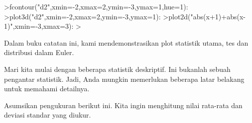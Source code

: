 \documentclass[a4paper,10pt]{article}
\begin{document}
\begin{eulernotebook}
\begin{eulercomment}
\begin{eulercomment}
\begin{eulercomment}
\begin{eulercomment}
\begin{eulercomment}
\begin{eulercomment}
\begin{eulercomment}
\begin{eulercomment}
\begin{eulercomment}
\begin{eulercomment}
\begin{eulercomment}
\begin{eulercomment}
\begin{eulercomment}
\begin{eulercomment}
\begin{eulercomment}
\begin{eulercomment}
\begin{eulercomment}
\begin{eulercomment}
\begin{eulercomment}
\begin{eulercomment}
\begin{eulercomment}
\begin{eulercomment}
\begin{eulercomment}
\begin{eulercomment}
\begin{eulercomment}
\begin{eulercomment}
\begin{eulercomment}
\begin{eulercomment}
\begin{eulercomment}
\begin{eulercomment}
\begin{eulercomment}
\begin{eulercomment}
\begin{eulercomment}
\begin{eulercomment}
\begin{eulercomment}
\begin{eulercomment}
\begin{eulercomment}
\begin{eulercomment}
\begin{eulercomment}
\begin{eulercomment}
\begin{eulercomment}
\begin{eulercomment}
\begin{eulerprompt}
>fcontour("d2",xmin=-2,xmax=2,ymin=-3,ymax=1,hue=1):
>plot3d("d2",xmin=-2,xmax=2,ymin=-3,ymax=1):
>plot2d("abs(x+1)+abs(x-1)",xmin=-3,xmax=3):
>  
\end{eulerprompt}
\begin{euleroutput}
  
\end{euleroutput}
\begin{eulercomment}
\begin{eulercomment}
\begin{eulercomment}
Dalam buku catatan ini, kami mendemonstrasikan plot statistik utama,
tes dan distribusi dalam Euler.

Mari kita mulai dengan beberapa statistik deskriptif. Ini bukanlah
sebuah pengantar statistik. Jadi, Anda mungkin memerlukan beberapa
latar belakang untuk memahami detailnya.

Asumsikan pengukuran berikut ini. Kita ingin menghitung nilai
rata-rata dan deviasi standar yang diukur.


\end{eulercomment}
\end{eulercomment}
\end{eulercomment}
\end{eulercomment}
\end{eulercomment}
\end{eulercomment}
\end{eulercomment}
\end{eulercomment}
\end{eulercomment}
\end{eulercomment}
\end{eulercomment}
\end{eulercomment}
\end{eulercomment}
\end{eulercomment}
\end{eulercomment}
\end{eulercomment}
\end{eulercomment}
\end{eulercomment}
\end{eulercomment}
\end{eulercomment}
\end{eulercomment}
\end{eulercomment}
\end{eulercomment}
\end{eulercomment}
\end{eulercomment}
\end{eulercomment}
\end{eulercomment}
\end{eulercomment}
\end{eulercomment}
\end{eulercomment}
\end{eulercomment}
\end{eulercomment}
\end{eulercomment}
\end{eulercomment}
\end{eulercomment}
\end{eulercomment}
\end{eulercomment}
\end{eulercomment}
\end{eulercomment}
\end{eulercomment}
\end{eulercomment}
\end{eulercomment}
\end{eulercomment}
\end{eulercomment}
\end{eulercomment}
\end{eulernotebook}
\end{document}
